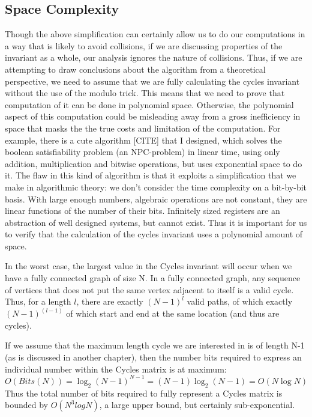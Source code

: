 \documentclass[11pt,a4paper]{report}
\begin{document}
\subsection{Space Complexity}
Though the above simplification can certainly allow us to do our computations in a way that is likely to avoid collisions, if we are discussing properties of the invariant as a whole, our analysis ignores the nature of collisions.
Thus, if we are attempting to draw conclusions about the algorithm from a theoretical perspective, we need to assume that we are fully calculating the cycles invariant without the use of the modulo trick.
This means that we need to prove that computation of it can be done in polynomial space.
Otherwise, the polynomial aspect of this computation could be misleading away from a gross inefficiency in space that masks the the true costs and limitation of the computation.
For example, there is a cute algorithm [CITE] that I designed, which solves the boolean satisfiability problem (an NPC-problem) in linear time, using only addition, multiplication and bitwise operations, but uses exponential space to do it. 
The flaw in this kind of algorithm is that it exploits a simplification that we make in algorithmic theory: we don't consider the time complexity on a bit-by-bit basis.
With large enough numbers, algebraic operations are not constant, they are linear functions of the number of their bits.
Infinitely sized registers are an abstraction of well designed systems, but cannot exist.
Thus it is important for us to verify that the calculation of the cycles invariant uses a polynomial amount of space.

In the worst case, the largest value in the Cycles invariant will occur when we have a fully connected graph of size N.
In a fully connected graph, any sequence of vertices that does not put the same vertex adjacent to itself is a valid cycle.
Thus, for a length $l$, there are exactly $(N-1)^l$ valid paths, of which exactly $(N-1)^{(l-1)}$ of which start and end at the same location (and thus are cycles).

If we assume that the maximum length cycle we are interested in is of length N-1 (as is discussed in another chapter), then the number bits required to express an individual number within the Cycles matrix is at maximum:
$$ O(Bits(N)) = \log_2 (N-1)^{N-1} = (N - 1) \log_2 (N-1) = O(N \log N)$$
Thus the total number of bits required to fully represent a Cycles matrix is bounded by $O(N^3logN)$, a large upper bound, but certainly sub-exponential.
\end{document}
